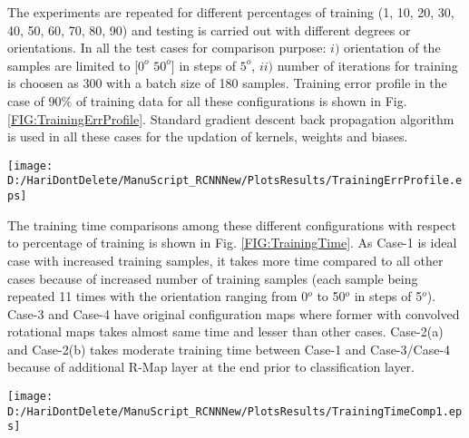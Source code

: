 The experiments are repeated for different percentages of training (1, 10, 20, 30, 40, 50, 60, 70, 80, 90) and testing is carried out with different degrees or orientations. In all the test cases for comparison purpose: $i)$ orientation of the samples are limited to [$0^o$ $50^o$] in steps of $5^o$, $ii)$ number of iterations for training is choosen as 300 with a batch size of 180 samples. Training error profile in the case of 90$\%$ of training data for all these configurations is shown in Fig. \ref{FIG:TrainingErrProfile}. Standard gradient descent back propagation algorithm is used in all these cases for the updation of kernels, weights and biases.\\


  \begin{figure*}
 \centering
 \texttt{[image: D:/HariDontDelete/ManuScript\_RCNNNew/PlotsResults/TrainingErrProfile.eps]}
\caption{ Training Error Profiles for all the cases under 90$\%$ of training data}
\label{FIG:TrainingErrProfile}
\end{figure*}

 The training time comparisons among these different configurations with respect to percentage of training is shown in Fig. \ref{FIG:TrainingTime}. As Case-1 is ideal case with increased training samples, it takes more time compared to all other cases because of increased number of training samples (each sample being repeated 11 times with the orientation ranging from 0$^o$ to 50$^o$ in steps of 5$^o$). Case-3 and Case-4 have original configuration maps where former with convolved rotational maps takes almost same time and lesser than other cases. Case-2(a) and Case-2(b) takes moderate training time between Case-1 and Case-3/Case-4 because of additional R-Map layer at the end prior to classification layer.\\
 

 \begin{figure*}
 \centering
 \texttt{[image: D:/HariDontDelete/ManuScript\_RCNNNew/PlotsResults/TrainingTimeComp1.eps]}
\caption{ Comparison of training time}
\label{FIG:TrainingTime}
\end{figure*}
 
